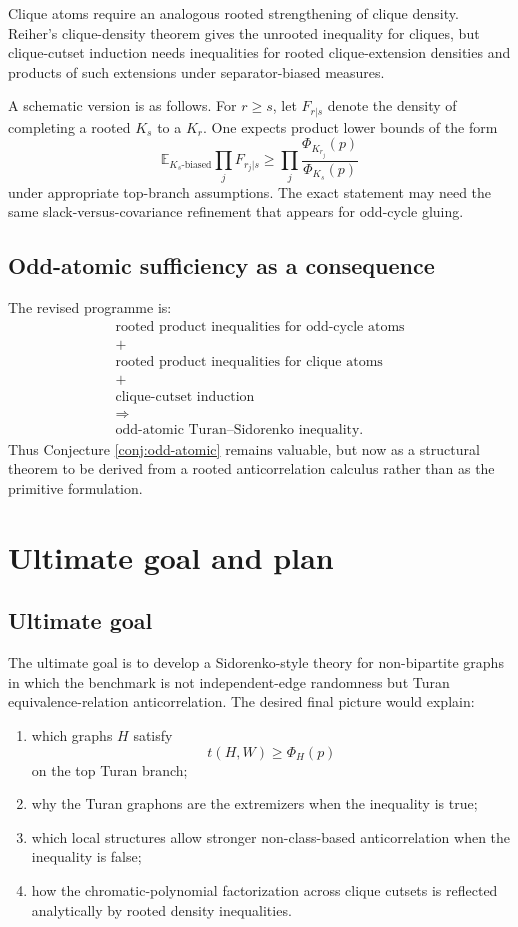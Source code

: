 \documentclass[11pt]{article}
\theoremstyle{definition}
\newcommand{\E}{\mathbb E}
\begin{document}
Clique atoms require an analogous rooted strengthening of clique density.  Reiher's clique-density theorem gives the unrooted inequality for cliques, but clique-cutset induction needs inequalities for rooted clique-extension densities and products of such extensions under separator-biased measures.

A schematic version is as follows.  For $r\ge s$, let $F_{r|s}$ denote the density of completing a rooted $K_s$ to a $K_r$.  One expects product lower bounds of the form
\[
  \E_{K_s\text{-biased}}\prod_j F_{r_j|s}
  \ge
  \prod_j \frac{\Phi_{K_{r_j}}(p)}{\Phi_{K_s}(p)}
\]
under appropriate top-branch assumptions.  The exact statement may need the same slack-versus-covariance refinement that appears for odd-cycle gluing.

\subsection{Odd-atomic sufficiency as a consequence}

The revised programme is:
\[
\boxed{
\begin{array}{c}
\text{rooted product inequalities for odd-cycle atoms}\\[2mm]
+\\[-1mm]
\text{rooted product inequalities for clique atoms}\\[2mm]
+\\[-1mm]
\text{clique-cutset induction}\\[2mm]
\Longrightarrow\\[2mm]
\text{odd-atomic Turan--Sidorenko inequality.}
\end{array}}
\]
Thus Conjecture \ref{conj:odd-atomic} remains valuable, but now as a structural theorem to be derived from a rooted anticorrelation calculus rather than as the primitive formulation.

\section{Ultimate goal and plan}

\subsection{Ultimate goal}

The ultimate goal is to develop a Sidorenko-style theory for non-bipartite graphs in which the benchmark is not independent-edge randomness but Turan equivalence-relation anticorrelation.  The desired final picture would explain:
\begin{enumerate}[label=(\roman*)]
\item which graphs $H$ satisfy
\[
  t(H,W)\ge\Phi_H(p)
\]
on the top Turan branch;
\item why the Turan graphons are the extremizers when the inequality is true;
\item which local structures allow stronger non-class-based anticorrelation when the inequality is false;
\item how the chromatic-polynomial factorization across clique cutsets is reflected analytically by rooted density inequalities.
\end{enumerate}
\end{document}
